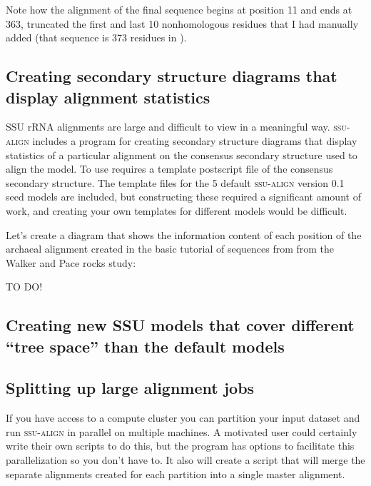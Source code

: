 Note how the alignment of the final sequence begins at position 11 and
ends at 363, truncated the first and last 10 nonhomologous residues
that I had manually added (that sequence is 373 residues in
).

\subsection{Creating secondary structure diagrams that
  display alignment statistics}

SSU rRNA alignments are large and difficult to view in a meaningful
way. \textsc{ssu-align} includes a program  for
creating secondary structure diagrams that display statistics of a
particular alignment on the consensus secondary structure used to
align the model. To use  requires a template
postscript file of the consensus secondary structure. The template
files for the 5 default \textsc{ssu-align} version 0.1 seed models are
included, but constructing these required a significant amount of
work, and creating your own templates for different models would be
difficult. 

Let's create a diagram that shows the information content of each
position of the archaeal alignment created in the basic tutorial of
sequences from from the Walker and Pace
rocks study:

TO DO!

\subsection{Creating new SSU models that cover
  different ``tree space'' than the default models}
\subsection{Splitting up large alignment jobs}

If you have access to a compute cluster you can partition your input
dataset and run \textsc{ssu-align} in parallel on multiple machines. A
motivated user could certainly write their own scripts to do this, but
the  program has options to facilitate this
parallelization so you don't have to.  It also will create a script
that will merge the separate alignments created for each partition
into a single master alignment.

